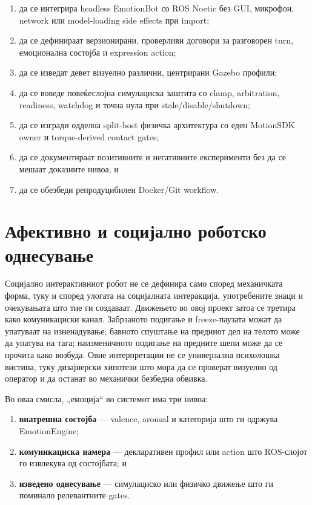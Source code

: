 \begin{enumerate}[label=\arabic*.]
  \item да се интегрира headless EmotionBot со ROS Noetic без GUI, микрофон,
  network или model-loading side effects при import;
  \item да се дефинираат верзионирани, проверливи договори за разговорен turn,
  емоционална состојба и expression action;
  \item да се изведат девет визуелно различни, центрирани Gazebo профили;
  \item да се воведе повеќеслојна симулациска заштита со clamp, arbitration,
  readiness, watchdog и точна нула при stale/disable/shutdown;
  \item да се изгради одделна split-host физичка архитектура со еден MotionSDK
  owner и torque-derived contact gates;
  \item да се документираат позитивните и негативните експерименти без да се
  мешаат доказните нивоа; и
  \item да се обезбеди репродуцибилен Docker/Git workflow.
\end{enumerate}

\section{Афективно и социјално роботско однесување}

Социјално интерактивниот робот не се дефинира само според механичката форма,
туку и според улогата на социјалната интеракција, употребените знаци и
очекувањата што тие ги создаваат.
Движењето во овој проект затоа се третира како комуникациски канал. Забрзаното
подигање и freeze-паузата можат да упатуваат на изненадување; бавното
спуштање на предниот дел на телото може да упатува на тага; наизменичното
подигање на предните шепи може да се прочита како возбуда. Овие интерпретации
не се универзална психолошка вистина, туку дизајнерски хипотези што мора да се
проверат визуелно од оператор и да останат во механички безбедна обвивка.

Во оваа смисла, „емоција“ во системот има три нивоа:

\begin{enumerate}
  \item \textbf{внатрешна состојба} --- valence, arousal и категорија што ги
  одржува EmotionEngine;
  \item \textbf{комуникациска намера} --- декларативен профил или action што
  ROS-слојот го извлекува од состојбата; и
  \item \textbf{изведено однесување} --- симулациско или физичко движење што
  ги поминало релевантните gates.
\end{enumerate}

